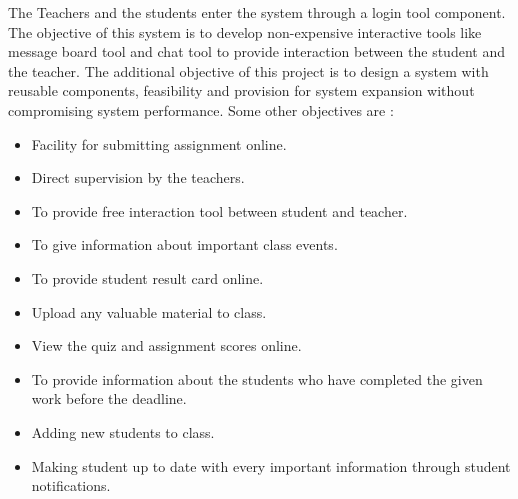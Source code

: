 \noindent The Teachers and the students enter the system through a login tool component. The objective of this system is to develop non-expensive interactive tools like message board tool and chat tool to provide interaction between the student and the teacher. The additional objective of this project is to design a system with reusable components, feasibility and provision for system expansion without compromising system performance. Some other objectives are :
\begin{itemize}
\item Facility for submitting assignment online.
\item Direct supervision by the teachers.
\item To provide free interaction tool between student and teacher.
\item To give information about important class events.
\item To provide student result card online.
\item Upload any valuable material to class.
\item View the quiz and assignment scores online.
\item To provide information about the students who have completed the given work before the deadline.
\item Adding new students to class.
\item Making student up to date with every important information through student notifications.
\end{itemize}